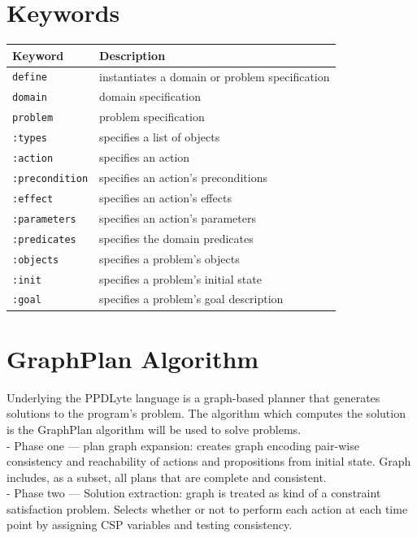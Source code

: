 \documentclass[
a4paper, %
11pt, %
onecolumn, %
openany, %
]{memoir}
\begin{document}
\section{Keywords}
\begin{center}
\begin{tabular}{ l  l }
Keyword    & Description\\
\hline
\hline
\texttt{define}  & instantiates a domain or problem specification\\
\hline
\texttt{domain}  & domain specification \\
\hline
\texttt{problem} & problem specification \\
\hline
\texttt{:types}  & specifies a list of objects \\
\hline
\texttt{:action} & specifies an action \\
\hline
\texttt{:precondition} & specifies an action's preconditions \\
\hline
\texttt{:effect} & specifies an action's effects\\
\hline
\texttt{:parameters} & specifies an action's parameters\\
\hline
\texttt{:predicates} & specifies the domain predicates \\
\hline
\texttt{:objects} & specifies a problem's objects\\
\hline
\texttt{:init} & specifies a problem's initial state\\
\hline
\texttt{:goal} & specifies a problem's goal description\\
\hline
\end{tabular}
\end{center}


\section{GraphPlan Algorithm}
Underlying the PPDLyte language is a graph-based planner that generates solutions to the program's problem. The algorithm which computes the solution is the GraphPlan \cite{source} algorithm will be used to solve problems.\\

- Phase one --- plan graph expansion: creates graph encoding pair-wise consistency and reachability of actions and propositions from initial state. Graph includes, as a subset, all plans that are complete and consistent.\\
- Phase two --- Solution extraction: graph is treated as kind of a constraint satisfaction problem. Selects whether or not to perform each action at each time point by assigning CSP variables and testing consistency.\\
\end{document}

